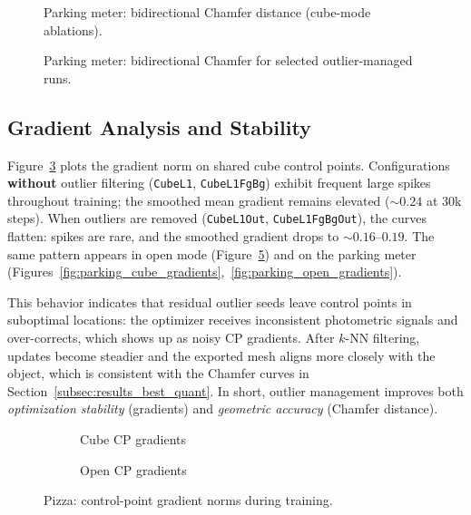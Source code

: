 \begin{figure}[H]
    \centering
    \caption{Parking meter: bidirectional Chamfer distance (cube-mode ablations).}
    \label{fig:parking_cube_chamfer_bid}
\end{figure}

\begin{figure}[H]
    \centering
    \caption{Parking meter: bidirectional Chamfer for selected outlier-managed runs.}
    \label{fig:parking_best_chamfer_bid}
\end{figure}

\subsection{Gradient Analysis and Stability}
\label{subsec:results_best_grad}

Figure~\ref{fig:pizza_cube_gradients} plots the gradient norm on shared cube control points. Configurations \textbf{without} outlier filtering (\texttt{CubeL1}, \texttt{CubeL1FgBg}) exhibit frequent large spikes throughout training; the smoothed mean gradient remains elevated ($\sim 0.24$ at 30k steps). When outliers are removed (\texttt{CubeL1Out}, \texttt{CubeL1FgBgOut}), the curves flatten: spikes are rare, and the smoothed gradient drops to $\sim 0.16$--$0.19$. The same pattern appears in open mode (Figure~\ref{fig:pizza_open_gradients}) and on the parking meter (Figures~\ref{fig:parking_cube_gradients},~\ref{fig:parking_open_gradients}).

This behavior indicates that residual outlier seeds leave control points in suboptimal locations: the optimizer receives inconsistent photometric signals and over-corrects, which shows up as noisy CP gradients. After $k$-NN filtering, updates become steadier and the exported mesh aligns more closely with the object, which is consistent with the Chamfer curves in Section~\ref{subsec:results_best_quant}. In short, outlier management improves both \emph{optimization stability} (gradients) and \emph{geometric accuracy} (Chamfer distance).

\begin{figure}[H]
    \centering
    \begin{subfigure}[t]{0.49\textwidth}
        \centering
        \caption{Cube CP gradients}
        \label{fig:pizza_cube_gradients}
    \end{subfigure}
    \hfill
    \begin{subfigure}[t]{0.49\textwidth}
        \centering
        \caption{Open CP gradients}
        \label{fig:pizza_open_gradients}
    \end{subfigure}
    \caption{Pizza: control-point gradient norms during training.}
\end{figure}

